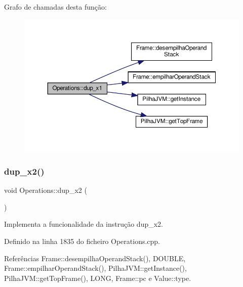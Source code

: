 Grafo de chamadas desta função\+:\nopagebreak
\begin{figure}[H]
\begin{center}
\leavevmode
\includegraphics[width=350pt]{classOperations_a46bab81a4a4bd1eda1c89b0b74f9e014_cgraph}
\end{center}
\end{figure}
\mbox{\label{classOperations_adbba871c60bfb34344f2012936beeb25}} 
\subsubsection{\texorpdfstring{dup\+\_\+x2()}{dup\_x2()}}
{\footnotesize\ttfamily void Operations\+::dup\+\_\+x2 (\begin{DoxyParamCaption}{ }\end{DoxyParamCaption})\hspace{0.3cm}{\ttfamily [private]}}



Implementa a funcionalidade da instrução dup\+\_\+x2. 



Definido na linha 1835 do ficheiro Operations.\+cpp.



Referências Frame\+::desempilha\+Operand\+Stack(), D\+O\+U\+B\+LE, Frame\+::empilhar\+Operand\+Stack(), Pilha\+J\+V\+M\+::get\+Instance(), Pilha\+J\+V\+M\+::get\+Top\+Frame(), L\+O\+NG, Frame\+::pc e Value\+::type.

